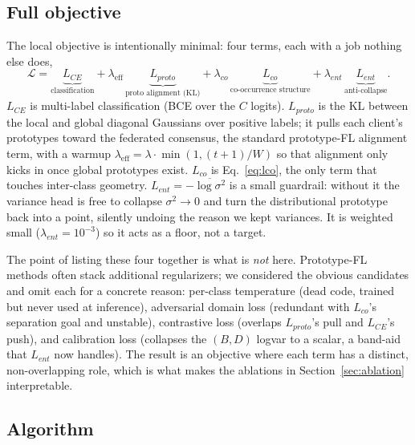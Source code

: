 \documentclass[11pt,a4paper]{article}
\theoremstyle{definition}
\begin{document}
\subsection{Full objective}
\label{sec:objective}

The local objective is intentionally minimal: four terms, each with a job nothing else does,
\begin{equation}
\mathcal{L}=\underbrace{L_{CE}}_{\text{classification}}+\lambda_{\text{eff}}\,\underbrace{L_{proto}}_{\text{proto alignment (KL)}}+\lambda_{co}\,\underbrace{L_{co}}_{\text{co-occurrence structure}}+\lambda_{ent}\,\underbrace{L_{ent}}_{\text{anti-collapse}}.
\label{eq:objective}
\end{equation}
$L_{CE}$ is multi-label classification (BCE over the $C$ logits). $L_{proto}$ is the KL between the local and global diagonal Gaussians over positive labels; it pulls each client's prototypes toward the federated consensus, the standard prototype-FL alignment term, with a warmup $\lambda_{\text{eff}}=\lambda\cdot\min(1,(t+1)/W)$ so that alignment only kicks in once global prototypes exist. $L_{co}$ is Eq.~\eqref{eq:lco}, the only term that touches inter-class geometry. $L_{ent}=-\overline{\log\sigma^{2}}$ is a small guardrail: without it the variance head is free to collapse $\sigma^{2}\to 0$ and turn the distributional prototype back into a point, silently undoing the reason we kept variances. It is weighted small ($\lambda_{ent}=10^{-3}$) so it acts as a floor, not a target.

The point of listing these four together is what is \emph{not} here. Prototype-FL methods often stack additional regularizers; we considered the obvious candidates and omit each for a concrete reason: per-class temperature (dead code, trained but never used at inference), adversarial domain loss (redundant with $L_{co}$'s separation goal and unstable), contrastive loss (overlaps $L_{proto}$'s pull and $L_{CE}$'s push), and calibration loss (collapses the $(B,D)$ logvar to a scalar, a band-aid that $L_{ent}$ now handles). The result is an objective where each term has a distinct, non-overlapping role, which is what makes the ablations in Section~\ref{sec:ablation} interpretable.

\subsection{Algorithm}
\end{document}
